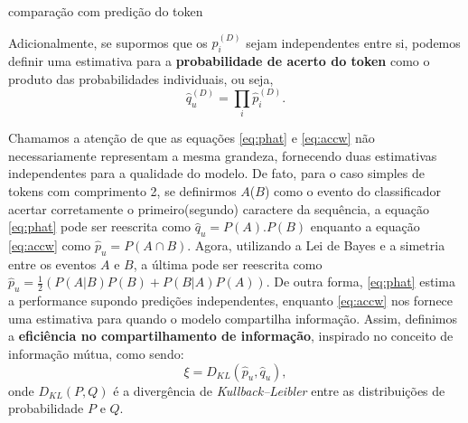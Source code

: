 comparação com predição do token

 Adicionalmente, se supormos que os $\hat{p}_i^{(D)}$ sejam independentes entre si, podemos definir uma estimativa para a \textbf{probabilidade de acerto do token} como o produto das probabilidades individuais, ou seja,
\begin{equation} \label{eq:phat}
	\hat{q}_u^{(D)} = \prod_{i} \hat{p}_i^{(D)}.
\end{equation}

Chamamos a atenção de que as equações \ref{eq:phat} e \ref{eq:accw} não necessariamente representam a mesma grandeza, fornecendo duas estimativas independentes para a qualidade do modelo. De fato, para o caso simples de tokens com comprimento 2, se definirmos $A$($B$) como o evento do classificador acertar corretamente o primeiro(segundo) caractere da sequência, a equação \ref{eq:phat} pode ser reescrita como $\hat{q}_u = P(A).P(B)$ enquanto a equação \ref{eq:accw} como $\hat{p}_u = P(A \cap B)$. Agora, utilizando a Lei de Bayes e a simetria entre os eventos $A$ e $B$, a última pode ser reescrita como $\hat{p}_u = \frac{1}{2} (P(A | B) P(B) + P(B|A)P(A))$. De outra forma, \ref{eq:phat} estima a performance supondo predições independentes, enquanto \ref{eq:accw} nos fornece uma estimativa para quando o modelo compartilha informação. Assim, definimos a \textbf{eficiência no compartilhamento de informação}, inspirado no conceito de informação mútua, como sendo: 
\begin{equation} \label{eq:sharing_efficiency}
\xi = D_{KL}(\hat{p}_u, \hat{q}_u),
\end{equation}
onde $D_{KL}(P, Q)$ é a divergência de \textit{Kullback–Leibler} entre as distribuições de probabilidade $P$ e $Q$.



